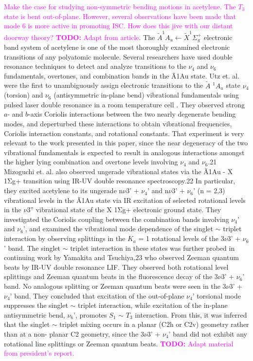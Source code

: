 \documentclass[12pt,draft]{mitthesis}
\newcommand{\TODO} [1]{\textcolor{magenta}{\textbf{TODO:} #1}}
\newcommand{\POINT}[1]{\textcolor{magenta}{#1}}
\begin{document}
%
%
%
%

\POINT{Make the case for studying non-symmetric bending motions in
  acetylene.  The $T_3$ state is bent out-of-plane.  However, several
  observations have been made that mode 6 is more active in promoting
  ISC.  How does this jive with our distant doorway theory?}
\TODO{Adapt from article}.  The $\tilde{A} ^1A_u \leftarrow \tilde{X}
^1\Sigma_g^+$ electronic band system of acetylene is one of the most
thoroughly examined electronic transitions of any polyatomic molecule.
Several researchers have used double resonance techniques to detect
and analyze transitions to the $\nu_4$ and $\nu_6$ fundamentals,
overtones, and combination bands in the Ã1Au state. Utz et. al. were
the first to unambiguously assign electronic transitions to the
$\tilde{A}$ $^1A_u$ state $\nu_4$ (torsion) and $\nu_6$ (antisymmetric
in-plane bend) vibrational fundamentals using pulsed laser double
resonance in a room temperature cell \cite{utz93}.  They observed
strong $a$- and $b$-axis Coriolis interactions between the two nearly
degenerate bending modes, and deperturbed these interactions to obtain
vibrational frequencies, Coriolis interaction constants, and
rotational constants.  That experiment is very relevant to the work
presented in this paper, since the near degeneracy of the two
vibrational fundamentals is expected to result in analogous
interactions amongst the higher lying combination and overtone levels
involving $\nu_4$ and $\nu_6$.21 Mizoguchi et. al. also observed
ungerade vibrational states via the Ã1Au - X 1Σg+ transition using
IR-UV double resonance spectroscopy.22 In particular, they excited
acetylene to its ungerade n$\nu$3' + $\nu_4$' and n$\nu$3' + $\nu_6$'
(n = 2,3) vibrational levels in the Ã1Au state via IR excitation of
selected rotational levels in the $\nu$3” vibrational state of the X
1Σg+ electronic ground state.  They investigated the Coriolis coupling
between the combination bands involving $\nu_4$' and $\nu_6$', and
examined the vibrational mode dependence of the singlet $\sim$ triplet
interaction by observing splittings in the $K_a$ = 1 rotational levels
of the 3$\nu$3' + $\nu_6$' band. The singlet $\sim$ triplet
interaction in these states was further probed in continuing work by
Yamakita and Tsuchiya,23 who observed Zeeman quantum beats by IR-UV
double resonance LIF. They observed both rotational level splittings
and Zeeman quantum beats in the fluorescence decay of the 3$\nu$3' +
$\nu_6$' band.  No analogous splitting or Zeeman quantum beats were
seen in the 3$\nu$3' + $\nu_4$' band. They concluded that excitation
of the out-of-plane $\nu_4$' torsional mode suppresses the singlet
$\sim$ triplet interaction, while excitation of the in-plane
antisymmetric bend, $\nu_6$', promotes $S_1$ $\sim$ $T_3$
interaction. From this, it was inferred that the singlet $\sim$
triplet mixing occurs in a planar (C2h or C2v) geometry rather than at
a non- planar C2 geometry, since the 3$\nu$3' + $\nu_4$' band did not
exhibit any rotational line splittings or Zeeman quantum beats.
\TODO{Adapt material from president's report.}
\end{document}
